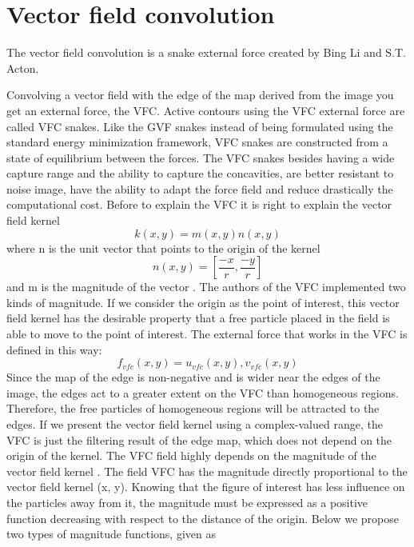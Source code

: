 \chapter{Vector field convolution}
The vector field convolution is a snake external force created by Bing Li and S.T. Acton.

\bigskip

Convolving a vector field with the edge of the map derived from the image you get an external force, the VFC. Active contours using the VFC external force are called VFC snakes. Like the GVF \cite{GVF} snakes instead of being formulated using the standard energy minimization framework, VFC snakes are constructed from a state of equilibrium between the forces. The VFC snakes besides having a wide capture range and the ability to capture the concavities, are better resistant to noise image, have the ability to adapt the force field and reduce drastically the computational cost.
Before to explain the VFC it is right to explain the vector field kernel
\begin{equation}
 k ( x,y ) =m(x,y)n(x,y)
\end{equation}
where n is the unit vector that points to the origin of the kernel	
\begin{equation}
n ( x,y ) = [\frac{-x}{r} , \frac{-y}{r} ]
\end{equation}
and m is the magnitude of the vector . The authors of the VFC implemented two kinds of magnitude. If we consider the origin as the point of interest, this vector field kernel has the desirable property that a free particle placed in the field is able to move to the point of interest. The external force that works in the VFC is defined in this way:
\begin{equation}
{f} _{vfc} ( x,y ) = {u} _{vfc} ( x,y ) , {v} _{vfc} (x,y)
\end{equation}
Since the map of the edge is non-negative and is wider near the edges of the image, the edges act to a greater extent on the VFC than homogeneous regions. Therefore, the free particles of homogeneous regions will be attracted to the edges. If we present the vector field kernel using a complex-valued range, the VFC is just the filtering result of the edge map, which does not depend on the origin of the kernel. The VFC field highly depends on the magnitude of the vector field kernel . The field VFC has the magnitude directly proportional to the vector field kernel (x, y). Knowing that the figure of interest has less influence on the particles away from it, the magnitude must be expressed as a positive function decreasing with respect to the distance of the origin. Below we propose two types of magnitude functions, given as
